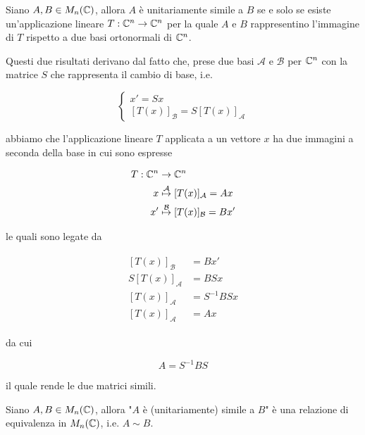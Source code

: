 \begin{definition}
	Siano $ A,B \in M_{n}(\mathbb{C}) $, allora $ A $ è unitariamente simile a $ B $ se e solo se esiste un'applicazione lineare $ T : \mathbb{C}^{n} \to \mathbb{C}^{n} $ per la quale $ A $ e $ B $ rappresentino l'immagine di $ T $ rispetto a due basi ortonormali di $ \mathbb{C}^{n} $.
\end{definition}

Questi due risultati derivano dal fatto che, prese due basi $ \mathcal{A} $ e $ \mathcal{B} $ per $ \mathbb{C}^{n} $ con la matrice $ S $ che rappresenta il cambio di base, i.e.

\begin{equation}
	\begin{cases}
		x' = S x\\
		[T(x)]_{\mathcal{B}} = S [T(x)]_{\mathcal{A}}
	\end{cases}
\end{equation}

abbiamo che l'applicazione lineare $ T $ applicata a un vettore $ x $ ha due immagini a seconda della base in cui sono espresse

\begin{align}
	\begin{split}
		T : \mathbb{C}^{n} &\to \mathbb{C}^{n} \\
		x &\stackrel{\mathcal{A}}{\mapsto} [T(x)]_{\mathcal{A}} = A x \\
		x' &\stackrel{\mathcal{B}}{\mapsto} [T(x)]_{\mathcal{B}} = B x'
	\end{split}
\end{align}

le quali sono legate da

\begin{align}
	\begin{split}
		[T(x)]_{\mathcal{B}} &= B x' \\
		S [T(x)]_{\mathcal{A}} &= B S x \\
		[T(x)]_{\mathcal{A}} &= S^{-1} B S x \\
		[T(x)]_{\mathcal{A}} &= A x
	\end{split}
\end{align}

da cui

\begin{equation}
	A = S^{-1} B S
\end{equation}

il quale rende le due matrici simili.

\begin{definition}
	Siano $ A,B \in M_{n}(\mathbb{C}) $, allora "$ A $ è (unitariamente) simile a $ B $" è una relazione di equivalenza in $ M_{n}(\mathbb{C}) $, i.e. $ A \sim B $.
\end{definition}

